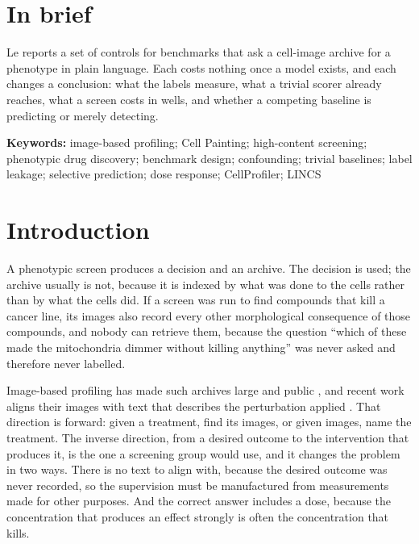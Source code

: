 \documentclass[11pt]{article}
\begin{document}
\section*{In brief}

Le reports a set of controls for benchmarks that ask a cell-image archive for a phenotype
in plain language. Each costs nothing once a model exists, and each changes a conclusion:
what the labels measure, what a trivial scorer already reaches, what a screen costs in
wells, and whether a competing baseline is predicting or merely detecting.

\vspace{0.5em}
\noindent\textbf{Keywords:} image-based profiling; Cell Painting; high-content screening;
phenotypic drug discovery; benchmark design; confounding; trivial baselines; label
leakage; selective prediction; dose response; CellProfiler; LINCS

\section{Introduction}

A phenotypic screen produces a decision and an archive. The decision is used; the archive
usually is not, because it is indexed by what was done to the cells rather than by what
the cells did. If a screen was run to find compounds that kill a cancer line, its images
also record every other morphological consequence of those compounds, and nobody can
retrieve them, because the question ``which of these made the mitochondria dimmer without
killing anything'' was never asked and therefore never labelled.

Image-based profiling has made such archives large and public
\citep{bray2016cellpainting,weisbart2024gallery,chandrasekaran2023jump,kraus2025rxrx3core},
and recent work aligns their images with text that describes the perturbation applied
\citep{lu2025cellclip,ilyosbekov2026morphoclip}. That direction is forward: given a
treatment, find its images, or given images, name the treatment. The inverse direction,
from a desired outcome to the intervention that produces it, is the one a screening group
would use, and it changes the problem in two ways. There is no text to align with, because
the desired outcome was never recorded, so the supervision must be manufactured from
measurements made for other purposes. And the correct answer includes a dose, because the
concentration that produces an effect strongly is often the concentration that kills.
\end{document}
